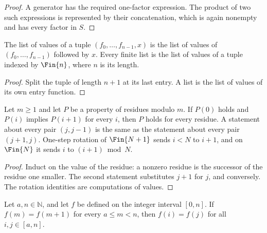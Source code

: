 \begin{proof}
    \leanok
    A generator has the required one-factor expression. The product of two
    such expressions is represented by their concatenation, which is again
    nonempty and has every factor in $S$.
\end{proof}

\begin{lemma}
    \label{lem:elementary_list_of_fin_snoc}
    \leanok
    The list of values of a tuple $(f_0,\ldots,f_{n-1},x)$ is the list of
    values of $(f_0,\ldots,f_{n-1})$ followed by $x$. Every finite list is
    the list of values of a tuple indexed by $\Fin{n}$, where $n$ is its
    length.
\end{lemma}

\begin{proof}
    \leanok
    Split the tuple of length $n+1$ at its last entry. A list is the list
    of values of its own entry function.
\end{proof}

\begin{lemma}
    \label{lem:elementary_fin_cyclic_induction}
    \leanok
    Let $m\geq1$ and let $P$ be a property of residues modulo $m$. If $P(0)$
    holds and $P(i)$ implies $P(i+1)$ for every $i$, then $P$ holds for every
    residue. A statement about every pair $(j,j-1)$ is the same as the
    statement about every pair $(j+1,j)$. One-step rotation of $\Fin{N+1}$
    sends $i<N$ to $i+1$, and on $\Fin{N}$ it sends $i$ to $(i+1)\bmod N$.
\end{lemma}

\begin{proof}
    \leanok
    Induct on the value of the residue: a nonzero residue is the successor
    of the residue one smaller. The second statement substitutes $j+1$ for
    $j$, and conversely. The rotation identities are computations of values.
\end{proof}

\begin{lemma}
    \label{lem:finite_interval_constancy}
    \leanok
    Let $a,n\in\mathbb N$, and let $f$ be defined on the integer interval
    $[0,n]$. If $f(m)=f(m+1)$ for every $a\le m<n$, then $f(i)=f(j)$ for all
    $i,j\in[a,n]$.
\end{lemma}

